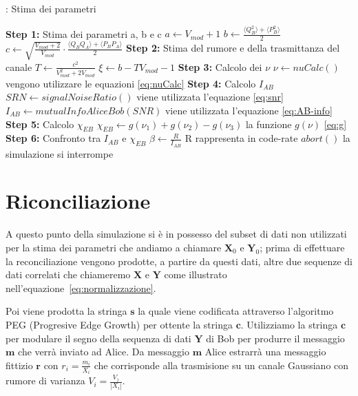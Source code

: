 \begin{algorithm}[H]
\caption{: Stima dei parametri}\label{al:stima-param}
\begin{algorithmic}[1]
\State \textbf{Step 1:} Stima dei parametri a, b e c \newline
	$a \leftarrow V_{mod} + 1$ \newline
	$b \leftarrow \frac{\langle Q_B^2 \rangle + \langle P_B^2\rangle}{2} $ \newline
	$c \leftarrow \sqrt{\frac{V_{mod} + 2}{V_{mod}}} \cdot \frac{\langle Q_BQ_A \rangle + \langle P_BP_A\rangle}{2}$ 
\State \textbf{Step 2:} Stima del rumore e della trasmittanza del canale \newline
	$T \leftarrow \frac{c^2}{V_{mod}^2 + 2 V_{mod}}$ \newline
	$\xi \leftarrow b - TV_{mod} -1 $ 
\State \textbf{Step 3:} Calcolo dei $\nu$ \newline
	$\textbf{$\nu$} \leftarrow nuCalc()$  		 \Comment vengono utilizzare le equazioni \ref{eq:nuCalc}
\State \textbf{Step 4:} Calcolo $I_{AB}$ \newline
	$SRN \leftarrow signalNoiseRatio()$	\Comment viene utilizzata l'equazione \ref{eq:snr}	
	$I_{AB} \leftarrow mutualInfoAliceBob(SNR)$	\Comment viene utilizzata l'equazione \ref{eq:AB-info}
\State \textbf{Step 5:} Calcolo $\chi_{EB}$ \newline
	$\chi_{EB} \leftarrow g(\nu_1) + g(\nu_2) - g(\nu_3)$	\Comment la funzione $g(\nu)$ \ref{eq:g}						
\State \textbf{Step 6:} Confronto tra $I_{AB}$ e $\chi_{EB}$  \newline
	$\beta \leftarrow \frac{R}{I_{AB}}$	\Comment R rappresenta in code-rate
		\State	$abort()$		\Comment la simulazione si interrompe
	\EndIf
\end{algorithmic}
\end{algorithm}


\section{Riconciliazione}
A questo punto della simulazione si \`e in possesso del subset di dati non utilizzati per la stima dei parametri che andiamo a chiamare $\textbf{X}_0$ e $\textbf{Y}_0$; prima di effettuare la reconciliazione vengono prodotte, a partire da questi dati, altre due sequenze di dati correlati che chiameremo $\textbf{X}$ e $\textbf{Y}$ come illustrato nell'equazione~\ref{eq:normalizzazione}. 

Poi viene prodotta la stringa $\textbf{s}$ la quale viene codificata attraverso l'algoritmo PEG (Progresive Edge Growth) per ottente la stringa $\textbf{c}$. Utilizziamo la stringa $\textbf{c}$ per modulare il segno della sequenza di dati $\textbf{Y}$ di Bob per produrre il messaggio  $\textbf{m}$ che verr\`a inviato ad Alice. Da messaggio  $\textbf{m}$ Alice estrarr\`a una messaggio fittizio $\textbf{r}$ con $r_i = \frac{m_i}{X_i}$ che corrisponde alla trasmisione su un canale Gaussiano con rumore di varianza $V_i = \frac{V_z}{|X_i|}$.

